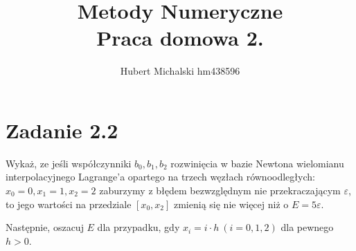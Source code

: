 \documentclass[a4paper]{article}
\title{\vspace{-1cm}
    Metody Numeryczne \\
    \large Praca domowa 2.
}
\author{
    Hubert Michalski hm438596 \\
}
\begin{document}
\maketitle

\section*{Zadanie 2.2}

Wykaż, ze jeśli współczynniki $b_0, b_1, b_2$ rozwinięcia w bazie Newtona wielomianu interpolacyjnego Lagrange'a opartego na trzech węzłach równoodległych: $x_0=0, x_1=1, x_2=2$ zaburzymy z błędem bezwzględnym nie przekraczającym $\varepsilon$, to jego wartości na przedziale $[ x_0, x_2 ]$  zmienią się nie więcej niż o $E=5\varepsilon$.

Następnie, oszacuj $E$ dla przypadku, gdy $x_i=i\cdot h \ (i=0,1,2)$  dla pewnego $h > 0$.
\end{document}
